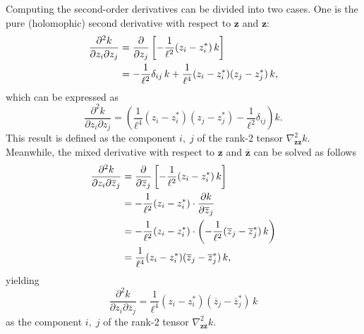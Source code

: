 Computing the second-order derivatives can be divided into two cases.
One is the pure (holomophic) second derivative with respect to \(\mathbf{z}\) and \(\mathbf{z}\):
\begin{align} \label{equ:A.22}
\frac{\partial^2 k}{\partial z_i \partial z_j} 
&= \frac{\partial}{\partial z_j} \left[ -\frac{1}{\ell^2} (z_i - z_i^*)\, k \right] \notag \\
&= -\frac{1}{\ell^2} \delta_{ij} \, k + \frac{1}{\ell^4} (z_i - z_i^*)(z_j - z_j^*)\, k,
\end{align}
which can be expressed as
\begin{equation} \label{equ:A.23}
\boxed{
\frac{\partial^2 k}{\partial z_i \partial z_j} 
= \left( \frac{1}{\ell^4} (z_i - z_i^*)(z_j - z_j^*) - \frac{1}{\ell^2} \delta_{ij} \right) k.
}
\end{equation}
This result is defined as the component $i,\;j$ of the rank-2 tensor \(\nabla^{2}_{\mathbf{z}\mathbf{z}}k\).
Meanwhile, the mixed derivative with respect to \(\mathbf{z}\) and \(\overline{\mathbf{z}}\) can be solved as follows 
\begin{align} \label{equ:A.24}
\frac{\partial^2 k}{\partial z_i \partial \overline{z}_j}
&= \frac{\partial}{\partial \overline{z}_j} \left[ -\frac{1}{\ell^2} (z_i - z_i^*)\, k \right] \notag \\
&= -\frac{1}{\ell^2} (z_i - z_i^*) \cdot \frac{\partial k}{\partial \overline{z}_j} \notag \\
&= -\frac{1}{\ell^2} (z_i - z_i^*) \cdot \left( -\frac{1}{\ell^2} (\overline{z}_j - \overline{z}_j^*)\, k \right) \notag \\
&= \frac{1}{\ell^4} (z_i - z_i^*)(\overline{z}_j - \overline{z}_j^*)\, k,
\end{align}
yielding
\begin{equation} \label{equ:A.25}
\boxed{
\frac{\partial^2 k}{\partial z_i \partial \overline{z}_j} 
= \frac{1}{\ell^4} (z_i - z_i^*)(\overline{z}_j - \overline{z}_j^*)\, k
}
\end{equation}
as the component $i,\;j$ of the rank-2 tensor \(\nabla^{2}_{\mathbf{z}\overline{\mathbf{z}}}k\).


